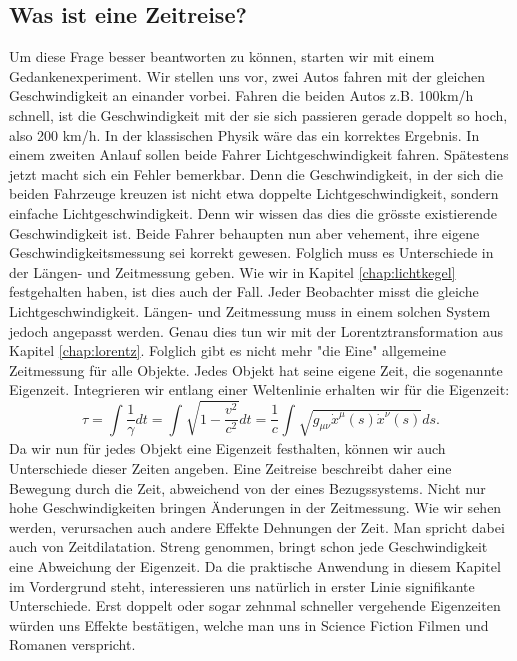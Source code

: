 \begin{refsection}
\section{Was ist eine Zeitreise?}
Um diese Frage besser beantworten zu können, starten wir mit einem Gedankenexperiment. Wir stellen uns vor, zwei Autos fahren mit der gleichen Geschwindigkeit an einander vorbei. Fahren die beiden Autos z.B. 100km/h schnell, ist die Geschwindigkeit mit der sie sich passieren gerade doppelt so hoch, also 200 km/h. In der klassischen Physik wäre das ein korrektes Ergebnis. In einem zweiten Anlauf sollen beide Fahrer Lichtgeschwindigkeit fahren. Spätestens jetzt macht sich ein Fehler bemerkbar. Denn die Geschwindigkeit, in der sich die beiden Fahrzeuge kreuzen ist nicht etwa doppelte Lichtgeschwindigkeit, sondern einfache Lichtgeschwindigkeit. Denn wir wissen das dies die grösste existierende Geschwindigkeit ist.
Beide Fahrer behaupten nun aber vehement, ihre eigene Geschwindigkeitsmessung sei korrekt gewesen. Folglich muss es Unterschiede in der Längen- und Zeitmessung geben.
Wie wir in Kapitel \ref{chap:lichtkegel} festgehalten haben, ist dies auch der Fall. Jeder Beobachter misst die gleiche Lichtgeschwindigkeit. Längen- und Zeitmessung muss in einem solchen System jedoch angepasst werden. Genau dies tun wir mit der Lorentztransformation aus Kapitel \ref{chap:lorentz}. Folglich gibt es nicht mehr "die Eine" allgemeine Zeitmessung für alle Objekte. Jedes Objekt hat seine eigene Zeit, die sogenannte Eigenzeit.
Integrieren wir entlang einer Weltenlinie erhalten wir für die Eigenzeit:
\begin{equation}\label{Eigenzeit}
\tau
=
\int_{}^{}\frac{1}{\gamma}dt=\int_{}^{}\sqrt{1-\frac{v^2}{c^2}}dt
=
\frac{1}{c}\int_{}^{}\sqrt{g_{\mu\nu}\dot{x}^{\mu}(s)\dot{x}^{\nu}(s)}ds.
\end{equation}
Da wir nun für jedes Objekt eine Eigenzeit festhalten, können wir auch Unterschiede dieser Zeiten angeben.
Eine Zeitreise beschreibt daher eine Bewegung durch die Zeit, abweichend von der eines Bezugssystems. 
Nicht nur hohe Geschwindigkeiten bringen Änderungen in der Zeitmessung. Wie wir sehen werden, verursachen auch andere Effekte Dehnungen der Zeit. Man spricht dabei auch von Zeitdilatation.
Streng genommen, bringt schon jede Geschwindigkeit eine Abweichung der Eigenzeit. Da die praktische 	Anwendung in diesem Kapitel im Vordergrund steht, interessieren uns natürlich in erster Linie signifikante Unterschiede. Erst doppelt oder sogar zehnmal schneller vergehende Eigenzeiten w\"urden uns Effekte best\"atigen, welche man uns in Science Fiction Filmen und Romanen verspricht.

\end{refsection}
